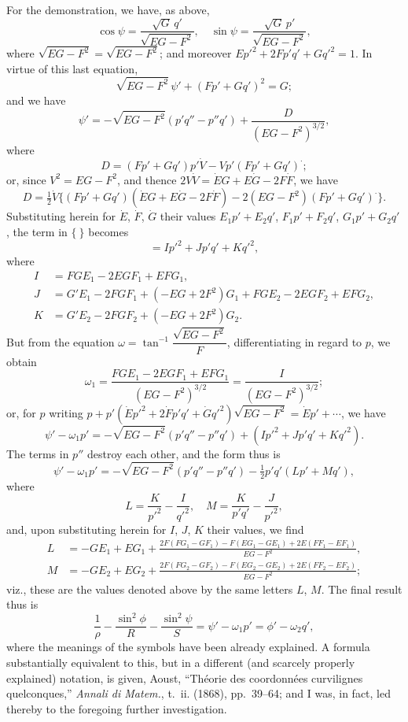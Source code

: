 \documentclass[11pt,a4paper]{book}
\begin{document}
For the demonstration, we have, as above,
\[
\cos\psi = \frac{\sqrt{G}\,q'}{\sqrt{EG - F^2}},\quad \sin\psi = \frac{\sqrt{G}\,p'}{\sqrt{EG - F^2}},
\]
where $\sqrt{EG - F^2} = \sqrt{EG - F^2}$; and moreover $Ep'^2 + 2Fp'q' + Gq'^2 = 1$. In virtue of this last equation,
\[
\sqrt{EG - F^2}\,\psi' + (Fp' + Gq')^2 = G;
\]
and we have
\[
\psi' = -\sqrt{EG - F^2}(p'q'' - p''q') + \frac{D}{(EG - F^2)^{3/2}},
\]
where
\[
D = (Fp' + Gq')p'\dot{V} - Vp'(Fp' + Gq')^\cdot;
\]
or, since $V^2 = EG - F^2$, and thence $2V\dot{V} = \dot{E}G + E\dot{G} - 2F\dot{F}$, we have
\[
D = \tfrac{1}{2}\dot{V}\{(Fp' + Gq')(\dot{E}G + E\dot{G} - 2F\dot{F}) - 2(EG - F^2)(Fp' + Gq')^\cdot\}.
\]
Substituting herein for $\dot{E}$, $\dot{F}$, $\dot{G}$ their values $E_1p' + E_2q'$, $F_1p' + F_2q'$, $G_1p' + G_2q'$, the term in $\{\ \}$ becomes
\[
= Ip'^2 + Jp'q' + Kq'^2,
\]
where
\[
\begin{aligned}
I &= FGE_1 - 2EGF_1 + EFG_1,\\
J &= G'E_1 - 2FGF_1 + (-EG + 2F^2)G_1 + FGE_2 - 2EGF_2 + EFG_2,\\
K &= G'E_2 - 2FGF_2 + (-EG + 2F^2)G_2.
\end{aligned}
\]
But from the equation $\omega = \tan^{-1}\dfrac{\sqrt{EG - F^2}}{F}$, differentiating in regard to $p$, we obtain
\[
\omega_1 = \frac{FGE_1 - 2EGF_1 + EFG_1}{(EG - F^2)^{3/2}} = \frac{I}{(EG - F^2)^{3/2}};
\]
or, for $p$ writing $p + p'(\dot{E}p'^2 + 2\dot{F}p'q' + \dot{G}q'^2)\sqrt{EG - F^2} = \dot{E}p' + \dotsb$, we have
\[
\psi' - \omega_1 p' = -\sqrt{EG - F^2}(p'q'' - p''q') + (Ip'^2 + Jp'q' + Kq'^2).
\]
The terms in $p''$ destroy each other, and the form thus is
\[
\psi' - \omega_1 p' = -\sqrt{EG - F^2}(p'q'' - p''q') - \tfrac{1}{2}p'q'(Lp' + Mq'),
\]
where
\[
L = \frac{K}{p'^2} - \frac{I}{q'^2},\quad M = \frac{K}{p'q'} - \frac{J}{p'^2},
\]
and, upon substituting herein for $I$, $J$, $K$ their values, we find
\[
\begin{aligned}
L &= -GE_1 + EG_1 + \frac{2F(FG_1 - GF_1) - F(EG_1 - GE_1) + 2E(FF_1 - EF_1)}{EG - F^2},\\
M &= -GE_2 + EG_2 + \frac{2F(FG_2 - GF_2) - F(EG_2 - GE_2) + 2E(FF_2 - EF_2)}{EG - F^2};
\end{aligned}
\]
viz., these are the values denoted above by the same letters $L$, $M$. The final result thus is
\[
\frac{1}{\rho} - \frac{\sin^2\phi}{R} - \frac{\sin^2\psi}{S} = \psi' - \omega_1 p' = \phi' - \omega_2 q',
\]
where the meanings of the symbols have been already explained. A formula substantially equivalent to this, but in a different (and scarcely properly explained) notation, is given, Aoust, ``Th\'eorie des coordonn\'ees curvilignes quelconques,'' \textit{Annali di Matem.}, t.~ii. (1868), pp.~39--64; and I was, in fact, led thereby to the foregoing further investigation.
\end{document}
